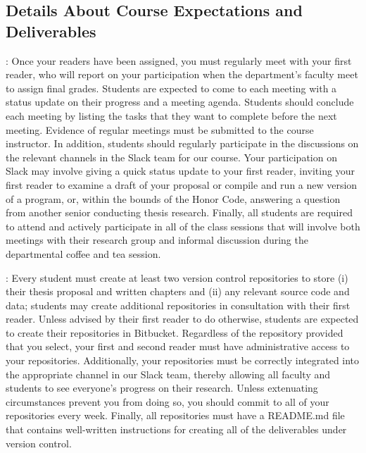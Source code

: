 \vspace*{-.25in}
\subsection*{Details About Course Expectations and Deliverables}
\vspace*{-.15in}

: Once your readers have been assigned, you must regularly meet with your first
reader, who will report on your participation when the department's faculty meet to assign final grades.  Students are
expected to come to each meeting with a status update on their progress and a meeting agenda.  Students should conclude
each meeting by listing the tasks that they want to complete before the next meeting. Evidence of regular meetings must
be submitted to the course instructor. In addition, students should regularly participate in the discussions on the
relevant channels in the Slack team for our course. Your participation on Slack may involve giving a quick status update
to your first reader, inviting your first reader to examine a draft of your proposal or compile and run a new version of
a program, or, within the bounds of the Honor Code, answering a question from another senior conducting thesis research.
Finally, all students are required to attend and actively participate in all of the class sessions that will involve
both meetings with their research group and informal discussion during the departmental coffee and tea session.

: Every student must create at least two version control repositories to store (i)
their thesis proposal and written chapters and (ii) any relevant source code and data; students may create additional
repositories in consultation with their first reader. Unless advised by their first reader to do otherwise, students are
expected to create their repositories in Bitbucket. Regardless of the repository provided that you select, your first
and second reader must have administrative access to your repositories. Additionally, your repositories must be
correctly integrated into the appropriate channel in our Slack team, thereby allowing all faculty and students to see
everyone's progress on their research. Unless extenuating circumstances prevent you from doing so, you should commit to
all of your repositories every week. Finally, all repositories must have a README.md file that contains well-written
instructions for creating all of the deliverables under version control.

